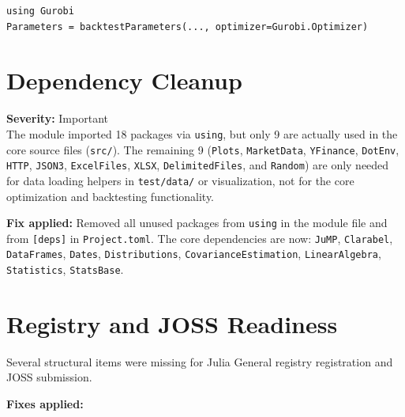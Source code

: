 \documentclass[11pt,a4paper]{article}
\begin{document}
\begin{lstlisting}
using Gurobi
Parameters = backtestParameters(..., optimizer=Gurobi.Optimizer)
\end{lstlisting}

\section{Dependency Cleanup}
\label{sec:deps}

\textbf{Severity:} Important\\[0.3em]
The module imported 18 packages via \texttt{using}, but only 9 are actually
used in the core source files (\texttt{src/}). The remaining 9
(\texttt{Plots}, \texttt{MarketData}, \texttt{YFinance}, \texttt{DotEnv},
\texttt{HTTP}, \texttt{JSON3}, \texttt{ExcelFiles}, \texttt{XLSX},
\texttt{DelimitedFiles}, and \texttt{Random}) are only needed for data loading
helpers in \texttt{test/data/} or visualization, not for the core optimization
and backtesting functionality.

\textbf{Fix applied:} Removed all unused packages from \texttt{using} in the
module file and from \texttt{[deps]} in \texttt{Project.toml}. The core
dependencies are now: \texttt{JuMP}, \texttt{Clarabel}, \texttt{DataFrames},
\texttt{Dates}, \texttt{Distributions}, \texttt{CovarianceEstimation},
\texttt{LinearAlgebra}, \texttt{Statistics}, \texttt{StatsBase}.

\section{Registry and JOSS Readiness}
\label{sec:readiness}

Several structural items were missing for Julia General registry registration
and JOSS submission.

\textbf{Fixes applied:}
\end{document}
